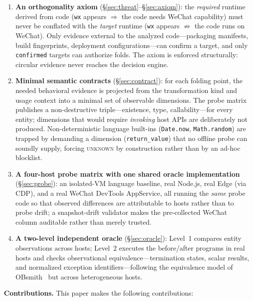 \documentclass[sigconf,nonacm]{acmart}
\begin{document}
\begin{enumerate}
  \item \textbf{An orthogonality axiom} (\S\ref{sec:threat}--\S\ref{sec:axiom}): the \emph{required} runtime derived from code (\texttt{wx} appears $\Rightarrow$ the code needs WeChat capability) must never be conflated with the \emph{target} runtime (\texttt{wx} appears $\not\Rightarrow$ the code runs on WeChat). Only evidence external to the analyzed code---packaging manifests, build fingerprints, deployment configurations---can confirm a target, and only \texttt{confirmed} targets can authorize folds. The axiom is enforced structurally: circular evidence never reaches the decision engine.
  \item \textbf{Minimal semantic contracts} (\S\ref{sec:contract}): for each folding point, the needed behavioral evidence is projected from the transformation kind and usage context into a minimal set of observable dimensions. The probe matrix publishes a non-destructive triple---existence, type, callability---for every entity; dimensions that would require \emph{invoking} host APIs are deliberately not produced. Non-deterministic language built-ins (\texttt{Date.now}, \texttt{Math.random}) are trapped by demanding a dimension (\texttt{return\_value}) that no offline probe can soundly supply, forcing \textsc{unknown} by construction rather than by an ad-hoc blocklist.
  \item \textbf{A four-host probe matrix with one shared oracle implementation} (\S\ref{sec:probe}): an isolated-VM language baseline, real Node.js, real Edge (via CDP), and a real WeChat DevTools AppService, all running the \emph{same} probe code so that observed differences are attributable to hosts rather than to probe drift; a snapshot-drift validator makes the pre-collected WeChat column auditable rather than merely trusted.
  \item \textbf{A two-level independent oracle} (\S\ref{sec:oracle}): Level~1 compares entity observations across hosts; Level~2 executes the before/after programs in real hosts and checks observational equivalence---termination states, scalar results, and normalized exception identifiers---following the equivalence model of OBsmith~\cite{obsmith} but across heterogeneous hosts.
\end{enumerate}

\textbf{Contributions.} This paper makes the following contributions:
\end{document}
